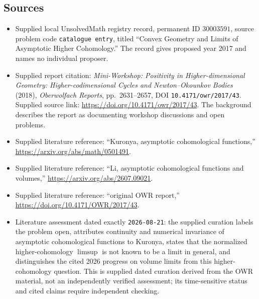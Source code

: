 \documentclass[11pt]{article}
\begin{document}
\subsection{Sources}
\begin{itemize}
\item Supplied local UnsolvedMath registry record, permanent ID \(30003591\), source problem code \texttt{catalogue entry}, titled ``Convex Geometry and Limits of Asymptotic Higher Cohomology.'' The record gives proposed year 2017 and names no individual proposer.
\item Supplied report citation: \emph{Mini-Workshop: Positivity in Higher-dimensional Geometry: Higher-codimensional Cycles and Newton--Okounkov Bodies} (2018), \emph{Oberwolfach Reports}, pp.\ 2631--2657, DOI \texttt{10.4171/owr/2017/43}. Supplied source link: \url{https://doi.org/10.4171/owr/2017/43}. The background describes the report as documenting workshop discussions and open problems.
\item Supplied literature reference: ``Kuronya, asymptotic cohomological functions,'' \url{https://arxiv.org/abs/math/0501491}.
\item Supplied literature reference: ``Li, asymptotic cohomological functions and volumes,'' \url{https://arxiv.org/abs/2607.09021}.
\item Supplied literature reference: ``original OWR report,'' \url{https://doi.org/10.4171/OWR/2017/43}.
\item Literature assessment dated exactly \texttt{2026-08-21}: the supplied curation labels the problem open, attributes continuity and numerical invariance of asymptotic cohomological functions to Kuronya, states that the normalized higher-cohomology \(\limsup\) is not known to be a limit in general, and distinguishes the cited 2026 progress on volume limits from this higher-cohomology question. This is supplied dated curation derived from the OWR material, not an independently verified assessment; its time-sensitive status and cited claims require independent checking.
\end{itemize}
\end{document}
